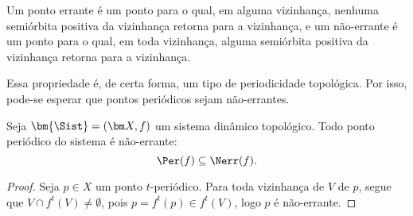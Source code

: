 
Um ponto errante é um ponto para o qual, em alguma vizinhança, nenhuma semiórbita positiva da vizinhança retorna para a vizinhança, e um não-errante é um ponto para o qual, em toda vizinhança, alguma semiórbita positiva da vizinhança retorna para a vizinhança.

Essa propriedade é, de certa forma, um tipo de periodicidade topológica. Por isso, pode-se esperar que pontos periódicos sejam não-errantes.

\begin{proposition}
Seja $\bm{\Sist}=(\bm X,f)$ um sistema dinâmico topológico. Todo ponto periódico do sistema é não-errante:
	\begin{equation*}
	\Per(f) \subseteq \Nerr(f).
	\end{equation*}
\end{proposition}
\begin{proof}
Seja $p \in X$ um ponto $t$-periódico. Para toda vizinhança de $V$ de $p$,  segue que $V \cap f^t(V) \neq \emptyset$, pois $p = f^t(p) \in f^t(V)$, logo $p$ é não-errante.
\end{proof}

